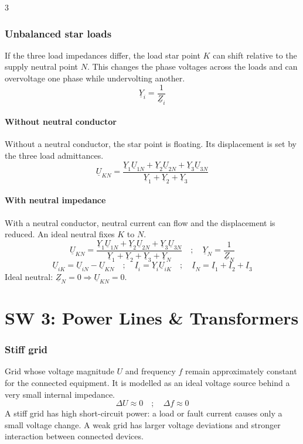 \documentclass[9pt, landscape, a4paper]{article}
\begin{document}
\begin{multicols*}{3}
\section{Unbalanced star loads}
If the three load impedances differ, the load star point $K$ can shift relative
to the supply neutral point $N$. This changes the phase voltages across the
loads and can overvoltage one phase while undervolting another.
\[
  \underline Y_i=\frac{1}{\underline Z_i}
\]
\subsection{Without neutral conductor}
Without a neutral conductor, the star point is floating. Its displacement is
set by the three load admittances.
\[
  \underline U_{KN}=
  \frac{\underline Y_1\underline U_{1N}
  +\underline Y_2\underline U_{2N}
  +\underline Y_3\underline U_{3N}}
  {\underline Y_1+\underline Y_2+\underline Y_3}
\]
\subsection{With neutral impedance}
With a neutral conductor, neutral current can flow and the displacement is
reduced. An ideal neutral fixes $K$ to $N$.
\[
  \underline U_{KN}=
  \frac{\underline Y_1\underline U_{1N}
  +\underline Y_2\underline U_{2N}
  +\underline Y_3\underline U_{3N}}
  {\underline Y_1+\underline Y_2+\underline Y_3+\underline Y_N}
  \quad ; \quad
  \underline Y_N=\frac{1}{\underline Z_N}
\]
\[
  \underline U_{iK}=\underline U_{iN}-\underline U_{KN}
  \quad ; \quad
  \underline I_i=\underline Y_i\underline U_{iK}
  \quad ; \quad
  \underline I_N=\underline I_1+\underline I_2+\underline I_3
\]
Ideal neutral: $\underline Z_N=0\Longrightarrow\underline U_{KN}=0$.

\part{SW 3: Power Lines \& Transformers}
\section{Stiff grid}
Grid whose voltage magnitude $U$ and frequency $f$ remain approximately
constant for the connected equipment. It is modelled as an ideal voltage source
behind a very small internal impedance.
\[
  \Delta U\approx0
  \quad ; \quad
  \Delta f\approx0
\]
A stiff grid has high short-circuit power: a load or fault current causes only
a small voltage change. A weak grid has larger voltage deviations and stronger
interaction between connected devices.


\end{multicols*}
\end{document}
